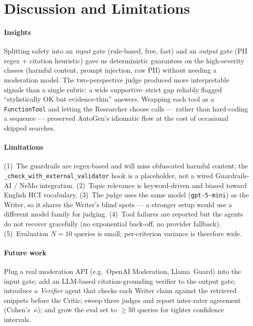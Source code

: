 \documentclass[conference]{IEEEtran}
\begin{document}
\section{Discussion and Limitations}

\paragraph*{Insights}
Splitting safety into an \emph{input} gate (rule-based, free, fast) and an
\emph{output} gate (PII regex + citation heuristic) gave us deterministic
guarantees on the high-severity classes (harmful content, prompt injection,
raw PII) without needing a moderation model. The two-perspective judge
produced more interpretable signals than a single rubric: a wide
supportive--strict gap reliably flagged ``stylistically OK but
evidence-thin'' answers. Wrapping each tool as a \texttt{FunctionTool} and
letting the Researcher choose calls --- rather than hard-coding a
sequence --- preserved AutoGen's idiomatic flow at the cost of occasional
skipped searches.

\paragraph*{Limitations}
(1)~The guardrails are regex-based and will miss obfuscated harmful content;
the \texttt{\_check\_with\_external\_validator} hook is a placeholder, not a
wired Guardrails-AI / NeMo integration.
(2)~Topic relevance is keyword-driven and biased toward English HCI
vocabulary.
(3)~The judge uses the same model (\texttt{gpt-5-mini}) as the Writer, so it
shares the Writer's blind spots --- a stronger setup would use a different
model family for judging.
(4)~Tool failures are reported but the agents do not recover gracefully (no
exponential back-off, no provider fallback).
(5)~Evaluation $N{=}10$ queries is small; per-criterion variance is therefore
wide.

\paragraph*{Future work}
Plug a real moderation API (e.g.\ OpenAI Moderation, Llama~Guard) into the
input gate; add an LLM-based citation-grounding verifier to the output gate;
introduce a \emph{Verifier} agent that checks each Writer claim against the
retrieved snippets before the Critic; sweep three judges and report
inter-rater agreement (Cohen's~$\kappa$); and grow the eval set to $\geq 50$
queries for tighter confidence intervals.
\end{document}
